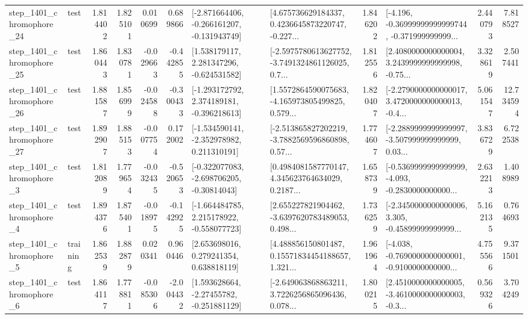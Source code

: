 \begin{tabular}{llrrrrllrlrr}
 step\_1401\_chromophore\_24 &      test &      1.814402 &    1.825101 &      0.010699 &  0.689866 &  [-2.871664406, -0.266161207, -0.131943749] &  [4.675736629184337, 0.4236645873220747, -0.227... &       1.846202 &  [-4.196, -0.36999999999999744, -0.371999999999... &            2.440793 &          7.818527 \\
 step\_1401\_chromophore\_25 &      test &      1.860443 &    1.830781 &     -0.029663 & -0.442855 &    [1.538179117, 2.281347296, -0.624531582] &  [-2.5975780613627752, -3.7491324861126025, 0.7... &       1.812556 &  [2.4080000000000004, 3.2439999999999998, -0.75... &            3.328619 &          2.507441 \\
 step\_1401\_chromophore\_26 &      test &      1.881587 &    1.856999 &     -0.024588 & -0.300433 &   [-1.293172792, 2.374189181, -0.396218613] &  [1.5572864590075683, -4.165973805499825, 0.579... &       1.820407 &  [-2.2790000000000017, 3.4720000000000013, -0.4... &            5.061547 &         12.734594 \\
 step\_1401\_chromophore\_27 &      test &      1.892907 &    1.885153 &     -0.007754 &  0.172002 &   [-1.534590141, -2.352978982, 0.211310191] &  [-2.513865827202219, -3.7882569596860898, 0.57... &       1.774607 &  [-2.2889999999999997, -3.507999999999999, 0.03... &            3.836729 &          6.722538 \\
  step\_1401\_chromophore\_3 &      test &      1.812089 &    1.779654 &     -0.032435 & -0.520653 &   [-0.322077083, -2.698706205, -0.30814043] &  [0.4984081587770147, 4.345623764634029, 0.2187... &       1.658739 &  [-0.5369999999999999, -4.093, -0.2830000000000... &            2.632213 &          1.408989 \\
  step\_1401\_chromophore\_4 &      test &      1.894376 &    1.875401 &     -0.018975 & -0.142925 &   [-1.664484785, 2.215178922, -0.558077723] &  [2.655227821904462, -3.6397620783489053, 0.498... &       1.736259 &  [-2.3450000000000006, 3.305, -0.45899999999999... &            5.162135 &          0.764693 \\
  step\_1401\_chromophore\_5 &  training &      1.862539 &    1.882879 &      0.020341 &  0.960446 &     [2.653698016, 0.279241354, 0.638818119] &  [4.488856150801487, 0.15571834454188657, 1.321... &       1.961964 &  [-4.038, -0.7690000000000001, -0.9100000000000... &            4.755566 &          9.371501 \\
  step\_1401\_chromophore\_6 &      test &      1.864117 &    1.778811 &     -0.085306 & -2.004432 &    [1.593628664, -2.27455782, -0.251881129] &  [-2.649063868863211, 3.7226256865096436, 0.078... &       1.800215 &  [2.4510000000000005, -3.4610000000000003, -0.3... &            0.569326 &          3.704249 \\

\end{tabular}
